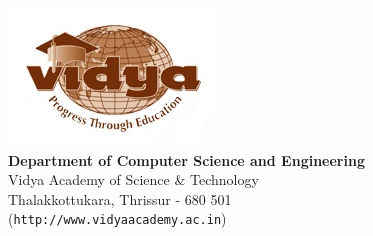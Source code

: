%
\newpage
\thispagestyle{empty}
\vspace*{\fill}
\begin{flushright}
\includegraphics{VidyaLogo}\\[0.5cm]
{\Large \bf \sf  Department of Computer Science and Engineering}\\
{\sf Vidya Academy of Science \& Technology\\
Thalakkottukara, Thrissur - 680 501\\
({\tt http://www.vidyaacademy.ac.in})}
\end{flushright}
%